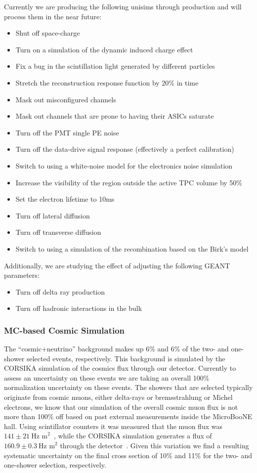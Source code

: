 Currently we are producing the following unisims through production and will process them in the near future:
\begin{itemize}
\item Shut off space-charge
\item Turn on a simulation of the dynamic induced charge effect 
\item Fix a bug in the scintillation light generated by different particles
\item Stretch the reconstruction response function by 20\% in time 
\item Mask out misconfigured channels
\item Mask out channels that are prone to having their ASICs saturate
\item Turn off the PMT single PE noise
\item Turn off the data-drive signal response (effectively a perfect calibration)
\item Switch to using a white-noise model for the electronics noise simulation
\item Increase the visibility of the region outside the active TPC volume by 50\%
\item Set the electron lifetime to 10ms 
\item Turn off lateral diffusion 
\item Turn off transverse diffusion 
\item Switch to using a simulation of the recombination based on the Birk’s model 
\end{itemize}

\noindent Additionally, we are studying the effect of adjusting the following GEANT parameters:
\begin{itemize}
\item Turn off delta ray production 
\item Turn off hadronic interactions in the bulk
\end{itemize}

\subsubsection{MC-based Cosmic Simulation}\label{sec:cosuncert}
The ``cosmic+neutrino'' background makes up 6\% and 6\% of the two- and one-shower selected events, respectively. This background is simulated by the CORSIKA simulation of the cosmics flux through our detector. Currently to assess an uncertainty on these events we are taking an overall 100\% normalization uncertainty on these events. The showers that are selected typically originate from cosmic muons, either delta-rays or bremsstrahlung or Michel electrons, we know that our simulation of the overall cosmic muon flux is not more than 100\% off based on past external measurements inside the MicroBooNE hall. Using scintillator counters it was measured that the muon flux was $141\pm21~\text{Hz~m}^2$~\cite{datacosflux}, while the CORSIKA simulation generates a flux of $160.9\pm0.3~\text{Hz~m}^2$  through the detector~\cite{mccosflux}. Given this variation we find a resulting systematic uncertainty on the final cross section of 10\% and 11\% for the two- and one-shower selection, respectively. 
 
